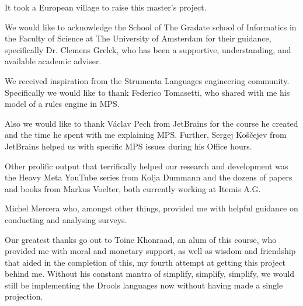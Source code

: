 \begin{acknowledgements}
\addchaptertocentry{\acknowledgementname}
It took a European village to raise this master's project.


We would like to acknowledge the School of The Gradate school of Informatics in the Faculty of Science at The University of Amsterdam for their guidance, specifically Dr. Clemens Grelck, who has been a supportive, understanding, and available academic adviser.


We received inspiration from the Strumenta Languages engineering community.
Specifically we would like to thank Federico Tomasetti, who shared with me his model of a rules engine in MPS.


Also we would like to thank Václav Pech from JetBrains for the course he created and the time he spent with me explaining MPS.
Further, Sergej Koščejev from JetBrains helped us with specific MPS issues during his Office hours.


Other prolific output that terrifically helped our research and development was the Heavy Meta YouTube series from Kolja Dummann and the dozens of papers and books from Markus Voelter, both currently working at Itemis A.G.


Michel Mercera who, amongst other things, provided me with helpful guidance on conducting and analysing surveys.


Our greatest thanks go out to Toine Khonraad, an alum of this course, who provided me with moral and monetary support, as well as wisdom and friendship that aided in the completion of this, my fourth attempt at getting this project behind me.
Without his constant mantra of simplify, simplify, simplify, we would still be implementing the Drools languages now without having made a single projection.
    
\end{acknowledgements}